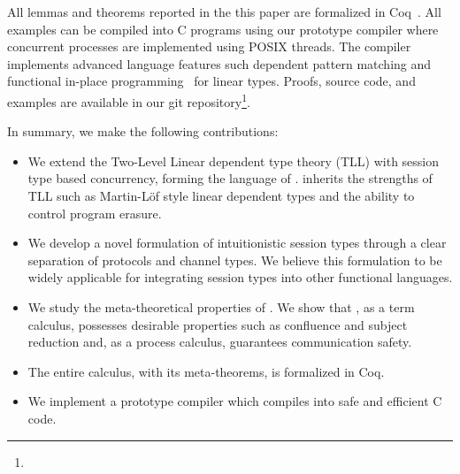 All lemmas and theorems reported in the this paper are formalized in
Coq~\cite{coq}. All examples can be compiled into C programs using our prototype
compiler where concurrent processes are implemented using POSIX threads.  The
compiler implements advanced language features such dependent pattern matching
and functional in-place programming~\cite{lorenzen23} for linear types.  Proofs,
source code, and examples are available in our git repository\footnote{\TODO}.

In summary, we make the following contributions:
\begin{itemize}
  \item We extend the Two-Level Linear dependent type theory (TLL) with session
        type based concurrency, forming the language of \TLLC{}. \TLLC{} inherits the
        strengths of TLL such as Martin-L\"{o}f style linear dependent types and the
        ability to control program erasure.
  \item We develop a novel formulation of intuitionistic session types
        through a clear separation of protocols and channel types. We believe
        this formulation to be widely applicable for integrating session types into
        other functional languages.
  \item We study the meta-theoretical properties of \TLLC{}. We show that
        \TLLC{}, as a term calculus, possesses desirable properties such as confluence and
        subject reduction and, as a process calculus, guarantees communication safety.
  \item The entire calculus, with its meta-theorems, is formalized in Coq.
  \item We implement a prototype compiler which compiles \TLLC{} into safe and
        efficient C code.
\end{itemize}



